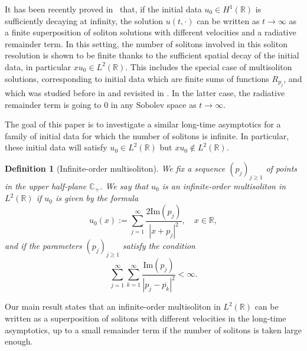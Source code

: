 \documentclass[english, 12pt]{amsart}%
\newcommand{\R}{\mathbb{R}}
\newcommand{\C}{\mathbb{C}}
\renewcommand{\Im}{\mathrm{Im}}
\newtheorem{definition}{Definition}[section]
\numberwithin{equation}{section}
\begin{document}
It has been recently proved in~\cite{GassotGM26} that, if the initial data $u_0\in H^1(\R)$ is sufficiently decaying at infinity,  the solution $u(t,\cdot )$ can be written as $t\to \infty$ as a finite superposition of soliton solutions with different velocities and a radiative remainder term. In this setting, the  number of solitons involved in this soliton resolution is shown to be finite thanks to the sufficient spatial decay of the initial data, in particular $xu_0\in L^2(\R)$. This includes the special case of multisoliton solutions, corresponding to initial data which are finite sums of functions $R_{p_j}$, and which was studied before in \cite{Matsuno79} and revisited in \cite{Sun2020}. In the latter case, the radiative remainder term is going to $0$  in any Sobolev space as $t\to \infty $.

  The goal of this paper is to investigate a similar long-time asymptotics for a family of initial data for which the number of solitons is infinite. In particular, these initial data will satisfy $u_0\in L^2(\R)$ but $x u_0\not\in L^2(\R)$.

\begin{definition}[Infinite-order multisoliton]\label{def:u0}
We fix a sequence $(p_j)_{j\geq 1}$ of points in the upper half-plane $\C_+$.  We say that $u_0$ is an infinite-order multisoliton in $L^2(\R)$ if $u_0$ is given by the formula
\begin{equation}\label{eq:u0}
u_0(x):=\sum_{j= 1}^{\infty}\frac{2\Im(p_j)}{|x+p_j|^2},
\quad x\in\R,
\end{equation}
and if the parameters $(p_j)_{j\geq 1}$ satisfy the condition
\begin{equation}\label{eq:norm}
\sum_{j=1}^{\infty}\sum_{k=1}^{\infty}\frac{\Im(p_j)}{|p_j-\overline{p_k}|^2}<\infty.
\end{equation}
\end{definition}


Our main result states that an infinite-order multisoliton in $L^2(\R)$ can be written as a superposition of solitons with different velocities in the long-time asymptotics, up to a small remainder term if the number of solitons is taken large enough.
\end{document}
